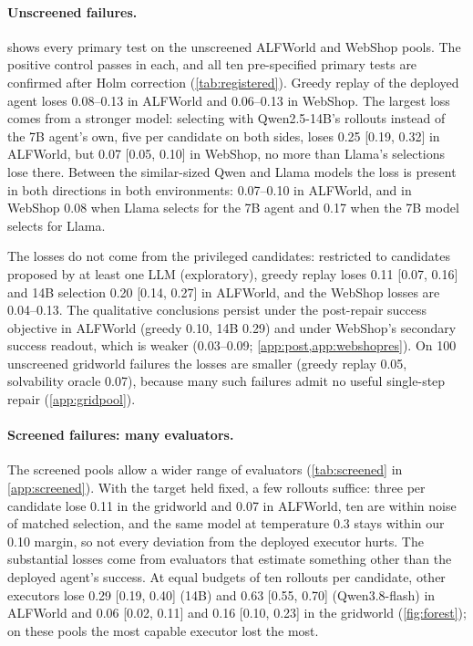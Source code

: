 \documentclass{article}
\theoremstyle{plain}
\theoremstyle{definition}
\theoremstyle{remark}
\begin{document}
\paragraph{Unscreened failures.}
 shows every primary test on the unscreened ALFWorld and WebShop pools. The positive control passes in each, and all ten pre-specified primary tests are confirmed after Holm correction (\cref{tab:registered}). Greedy replay of the deployed agent loses 0.08--0.13 in ALFWorld and 0.06--0.13 in WebShop. The largest loss comes from a stronger model: selecting with Qwen2.5-14B's rollouts instead of the 7B agent's own, five per candidate on both sides, loses 0.25 [0.19, 0.32] in ALFWorld, but 0.07 [0.05, 0.10] in WebShop, no more than Llama's selections lose there. Between the similar-sized Qwen and Llama models the loss is present in both directions in both environments: 0.07--0.10 in ALFWorld, and in WebShop 0.08 when Llama selects for the 7B agent and 0.17 when the 7B model selects for Llama.

The losses do not come from the privileged candidates: restricted to candidates proposed by at least one LLM (exploratory), greedy replay loses 0.11 [0.07, 0.16] and 14B selection 0.20 [0.14, 0.27] in ALFWorld, and the WebShop losses are 0.04--0.13. The qualitative conclusions persist under the post-repair success objective in ALFWorld (greedy 0.10, 14B 0.29) and under WebShop's secondary success readout, which is weaker (0.03--0.09; \cref{app:post,app:webshopres}). On 100 unscreened gridworld failures the losses are smaller (greedy replay 0.05, solvability oracle 0.07), because many such failures admit no useful single-step repair (\cref{app:gridpool}).


\paragraph{Screened failures: many evaluators.}
The screened pools allow a wider range of evaluators (\cref{tab:screened} in \cref{app:screened}). With the target held fixed, a few rollouts suffice: three per candidate lose 0.11 in the gridworld and 0.07 in ALFWorld, ten are within noise of matched selection, and the same model at temperature 0.3 stays within our 0.10 margin, so not every deviation from the deployed executor hurts. The substantial losses come from evaluators that estimate something other than the deployed agent's success. At equal budgets of ten rollouts per candidate, other executors lose 0.29 [0.19, 0.40] (14B) and 0.63 [0.55, 0.70] (Qwen3.8-flash) in ALFWorld and 0.06 [0.02, 0.11] and 0.16 [0.10, 0.23] in the gridworld (\cref{fig:forest}); on these pools the most capable executor lost the most.
\end{document}
